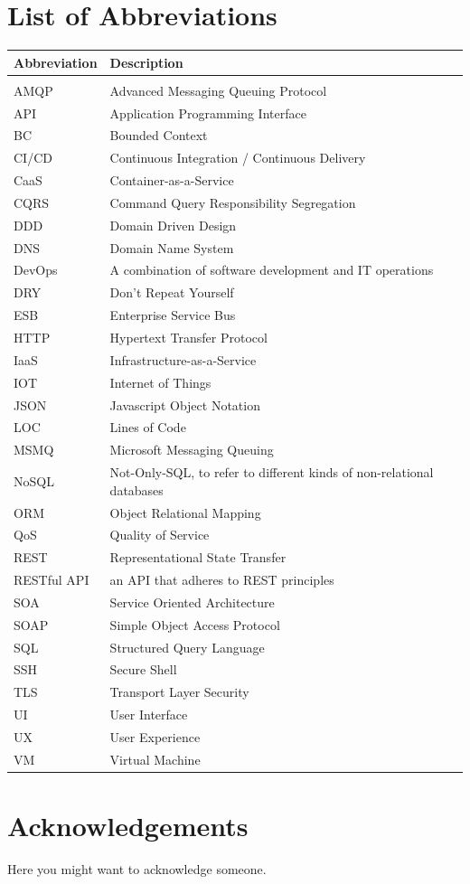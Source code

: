 \documentclass{Configuration_Files/PoliMi3i_thesis}
\begin{document}
\chapter*{List of Abbreviations}
\begin{table}[H]
    \centering
    \begin{tabular}{ll}
        \textbf{Abbreviation} & \textbf{Description} \\\hline\\[-9px]
        AMQP & Advanced Messaging Queuing Protocol \\[2px]
        API & Application Programming Interface \\[2px]
        BC & Bounded Context \\[2px]
        CI/CD & Continuous Integration / Continuous Delivery \\[2px]
        CaaS & Container-as-a-Service \\[2px]
        CQRS & Command Query Responsibility Segregation \\[2px]
        DDD & Domain Driven Design \\[2px]
        DNS & Domain Name System \\[2px]
        DevOps & A combination of software development and IT operations \\[2px]
        DRY & Don't Repeat Yourself \\[2px]
        ESB & Enterprise Service Bus \\[2px]
        HTTP & Hypertext Transfer Protocol \\[2px]
        IaaS & Infrastructure-as-a-Service \\[2px]
        IOT & Internet of Things \\[2px]
        JSON & Javascript Object Notation \\[2px]
        LOC & Lines of Code \\[2px]
        MSMQ & Microsoft Messaging Queuing \\[2px]
        NoSQL & Not-Only-SQL, to refer to different kinds of non-relational databases \\[2px]
        ORM & Object Relational Mapping \\[2px]
        QoS & Quality of Service \\[2px]
        REST & Representational State Transfer \\[2px]
        RESTful API & an API that adheres to REST principles \\[2px]
        SOA & Service Oriented Architecture \\[2px]
        SOAP & Simple Object Access Protocol \\[2px]
        SQL & Structured Query Language \\[2px]
        SSH & Secure Shell \\[2px]
        TLS & Transport Layer Security \\[2px]
        UI & User Interface \\[2px]
        UX & User Experience \\[2px]
        VM & Virtual Machine \\[2px]
    \end{tabular}
\end{table}

\chapter*{Acknowledgements}
Here you might want to acknowledge someone.

\cleardoublepage
\end{document}
